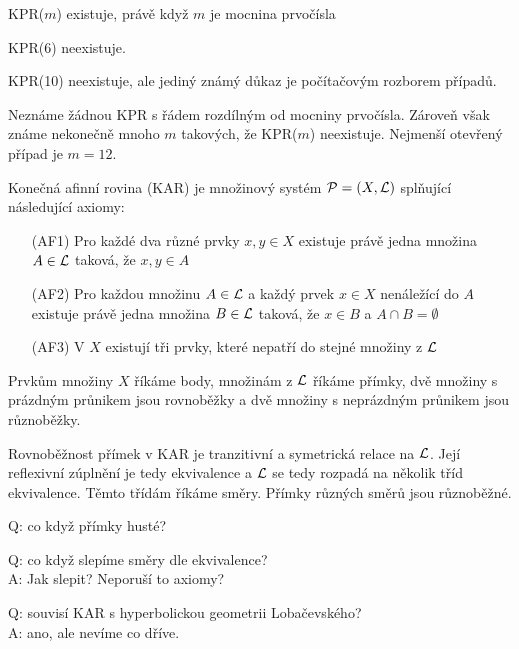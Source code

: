 \begin{conj}
    KPR($m$) existuje, právě když $m$ je mocnina prvočísla
\end{conj}
\begin{theorem}
    KPR(6) neexistuje.
\end{theorem}
\begin{note}
    KPR(10) neexistuje, ale jediný známý důkaz je počítačovým rozborem případů.

    Neznáme žádnou KPR s řádem rozdílným od mocniny prvočísla.
    Zároveň však známe nekonečně mnoho $m$ takových, že KPR($m$) neexistuje.
    Nejmenší otevřený případ je $m=12$.
\end{note}
\begin{definition}
    Konečná afinní rovina (KAR) je množinový systém $\mathcal{P}=(X,\operatorname{\mathcal{L}})$ splňující následující axiomy:
    \begin{itemize}
        \item[(AF1)] Pro každé dva různé prvky $x,y\in X$ existuje právě jedna množina $A\in\operatorname{\mathcal{L}}$ taková, že $x,y\in A$
        \item[(AF2)] Pro každou množinu $A\in\operatorname{\mathcal{L}}$ a každý prvek $x\in X$ nenáležící do $A$ existuje právě jedna množina $B\in\operatorname{\mathcal{L}}$ taková, že $x\in B$ a $A\cap B=\emptyset$
        \item[(AF3)] V $X$ existují tři prvky, které nepatří do stejné množiny z $\operatorname{\mathcal{L}}$
    \end{itemize}

    Prvkům množiny $X$ říkáme body, množinám z $\operatorname{\mathcal{L}}$ říkáme přímky, dvě množiny s prázdným průnikem jsou rovnoběžky a dvě množiny s neprázdným průnikem jsou různoběžky.
\end{definition}
\begin{note}
    Rovnoběžnost přímek v KAR je tranzitivní a symetrická relace na $\operatorname{\mathcal{L}}$.
    Její reflexivní zúplnění je tedy ekvivalence a $\operatorname{\mathcal{L}}$ se tedy rozpadá na několik tříd ekvivalence. Těmto třídám říkáme směry.
    Přímky různých směrů jsou různoběžné.
\end{note}
Q: co když přímky husté?

Q: co když slepíme směry dle ekvivalence?\\
A: Jak slepit? Neporuší to axiomy?

Q: souvisí KAR s hyperbolickou geometrii Lobačevského?\\
A: ano, ale nevíme co dříve.

